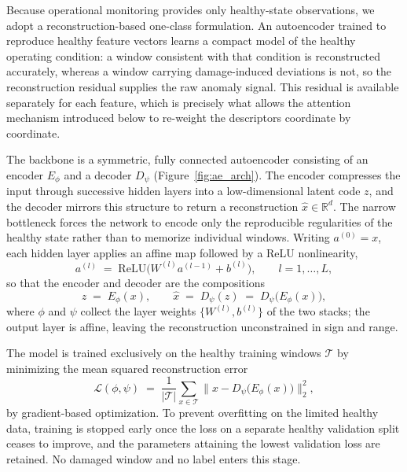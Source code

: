 \documentclass[11pt,a4paper]{article}
\begin{document}
Because operational monitoring provides only healthy-state observations, we adopt
a reconstruction-based one-class formulation. An autoencoder trained to reproduce
healthy feature vectors learns a compact model of the healthy operating condition:
a window consistent with that condition is reconstructed accurately, whereas a
window carrying damage-induced deviations is not, so the reconstruction residual
supplies the raw anomaly signal. This residual is available separately for each
feature, which is precisely what allows the attention mechanism introduced below
to re-weight the descriptors coordinate by coordinate.

The backbone is a symmetric, fully connected autoencoder consisting of an encoder
$E_\phi$ and a decoder $D_\psi$ (Figure~\ref{fig:ae_arch}). The encoder compresses
the input through successive hidden layers into a low-dimensional latent code $z$,
and the decoder mirrors this structure to return a reconstruction
$\hat{x} \in \mathbb{R}^{d}$. The narrow bottleneck forces the network to encode
only the reproducible regularities of the healthy state rather than to memorize
individual windows. Writing $a^{(0)} = x$, each hidden layer applies an affine
map followed by a ReLU nonlinearity,
\begin{equation}
a^{(l)} \;=\; \mathrm{ReLU}\!\bigl(W^{(l)} a^{(l-1)} + b^{(l)}\bigr),
\qquad l = 1,\dots,L,
\label{eq:layer}
\end{equation}
so that the encoder and decoder are the compositions
\begin{equation}
z \;=\; E_\phi(x), \qquad \hat{x} \;=\; D_\psi(z) \;=\; D_\psi\!\bigl(E_\phi(x)\bigr),
\label{eq:encdec}
\end{equation}
where $\phi$ and $\psi$ collect the layer weights $\{W^{(l)}, b^{(l)}\}$ of the two
stacks; the output layer is affine, leaving the reconstruction unconstrained in
sign and range.

The model is trained exclusively on the healthy training windows $\mathcal{T}$ by
minimizing the mean squared reconstruction error
\begin{equation}
\mathcal{L}(\phi,\psi) \;=\;
\frac{1}{|\mathcal{T}|}\sum_{x \in \mathcal{T}}
\bigl\lVert x - D_\psi\!\bigl(E_\phi(x)\bigr) \bigr\rVert_2^2 ,
\label{eq:loss}
\end{equation}
by gradient-based optimization. To prevent overfitting on the limited healthy
data, training is stopped early once the loss on a separate healthy validation
split ceases to improve, and the parameters attaining the lowest validation loss
are retained. No damaged window and no label enters this stage.
\end{document}
